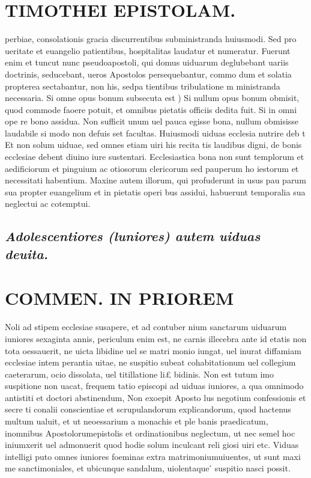 \documentclass{article}
\begin{document}
\begin{pages}
\section*{TIMOTHEI EPISTOLAM. }
\marginpar{[ p.129 ]}\pstart perbiae, consolationis gracia discurrentibus subministranda huiusmodi. Sed pro ueritate et euangelio patientibus, hospitalitas laudatur et numeratur. Fuerunt enim et tuncut nunc pseudoapostoli, qui domus uiduarum deglubebant uariis doctrinis, seducebant, ueros Apostolos persequebantur, commo dum et solatia propterea sectabantur, non his, sedpa tientibus tribulatione m ministranda necessaria.  \pend\pstart Si omne opus bonum subsecuta est ) Si nullum opus bonum obmisit, quod commode faoere potuit, et omnibus pietatis officiis dedita fuit. Si in omni ope re bono assidua. Non sufficit unum uel pauca egisse bona, nullum obmisisse laudabile si modo non defuis set facultas. Huiusmodi uiduas ecclesia nutrire deb t Et non solum uiduae, sed omnes etiam uiri his recita tis laudibus digni, de bonis ecclesiae debent diuino iure sustentari. Ecclesiastica bona non sunt templorum et aedificiorum et pinguium ac otiosorum clericorum sed pauperum ho iestorum et necessitati habentium. Maxine autem illorum, qui profuderunt in usus pau parum sua propter euangelium et in pietatis operi bus assidui, habuerunt temporalia sua neglectui ac cotemptui.  \pend
{}
{}
\subsection*{\textit{Adolescentiores (luniores) autem uiduas deuita. }}
\section*{COMMEN. IN PRIOREM }
\marginpar{[ p.130 ]}\pstart Noli ad stipem ecclesiae susapere, et ad contuber nium sanctarum uiduarum iuniores sexaginta annis, periculum enim est, ne carnis illecebra ante id etatis non tota oessauerit, ne uicta libidine uel se matri monio iungat, uel inurat diffamiam ecclesiae intem perantia uitae, ne suspitio subeat cohabitationum uel collegium caeterarum, ocio dissolata, uel titillatione li£ bidinis. Non est tutum imo suspitione non uacat, frequem tatio episcopi ad uiduas iuniores, a qua omnimodo antistiti et doctori abstinendum, Non exoepit Aposto lus negotium confessionis et secre ti conalii conscientiae et scrupulandorum explicandorum, quod hactenus multum ualuit, et ut neoessarium a monachis et ple banis praedicatum, inomnibus Apostolorumepistolis et ordinationibus neglectum, ut nec semel hoc iniumxerit uel admonuerit quod hodie solum inculcant reli giosi uiri etc. Viduas intelligi puto omnes iuniores foeminas extra matrimoniumuiuentes, ut sunt maxi me sanctimoniales, et ubicunque sandalum, uiolentaque ́ suspitio nasci possit.  \pend
{}
{}

\end{pages}
\end{document}
